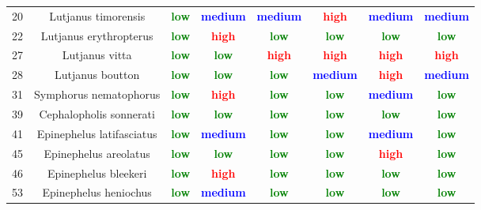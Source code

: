\documentclass{report}\usepackage[]{graphicx}\usepackage[]{color}
\begin{document}
\begin{table}[ht]
{\begin{tabular}{cccccccc}
   20 & Lutjanus timorensis & \textcolor{green}{\textbf{low}} & \textcolor{blue}{\textbf{medium}} & \textcolor{blue}{\textbf{medium}} & \textcolor{red}{\textbf{high}} & \textcolor{blue}{\textbf{medium}} & \textcolor{blue}{\textbf{medium}} \\ 
   22 & Lutjanus erythropterus & \textcolor{green}{\textbf{low}} & \textcolor{red}{\textbf{high}} & \textcolor{green}{\textbf{low}} & \textcolor{green}{\textbf{low}} & \textcolor{green}{\textbf{low}} & \textcolor{green}{\textbf{low}} \\ 
   27 & Lutjanus vitta & \textcolor{green}{\textbf{low}} & \textcolor{green}{\textbf{low}} & \textcolor{red}{\textbf{high}} & \textcolor{red}{\textbf{high}} & \textcolor{red}{\textbf{high}} & \textcolor{red}{\textbf{high}} \\ 
   28 & Lutjanus boutton & \textcolor{green}{\textbf{low}} & \textcolor{green}{\textbf{low}} & \textcolor{green}{\textbf{low}} & \textcolor{blue}{\textbf{medium}} & \textcolor{red}{\textbf{high}} & \textcolor{blue}{\textbf{medium}} \\ 
   31 & Symphorus nematophorus & \textcolor{green}{\textbf{low}} & \textcolor{red}{\textbf{high}} & \textcolor{green}{\textbf{low}} & \textcolor{green}{\textbf{low}} & \textcolor{blue}{\textbf{medium}} & \textcolor{green}{\textbf{low}} \\ 
   39 & Cephalopholis sonnerati & \textcolor{green}{\textbf{low}} & \textcolor{green}{\textbf{low}} & \textcolor{green}{\textbf{low}} & \textcolor{green}{\textbf{low}} & \textcolor{green}{\textbf{low}} & \textcolor{green}{\textbf{low}} \\ 
   41 & Epinephelus latifasciatus & \textcolor{green}{\textbf{low}} & \textcolor{blue}{\textbf{medium}} & \textcolor{green}{\textbf{low}} & \textcolor{green}{\textbf{low}} & \textcolor{blue}{\textbf{medium}} & \textcolor{green}{\textbf{low}} \\ 
   45 & Epinephelus areolatus & \textcolor{green}{\textbf{low}} & \textcolor{green}{\textbf{low}} & \textcolor{green}{\textbf{low}} & \textcolor{green}{\textbf{low}} & \textcolor{red}{\textbf{high}} & \textcolor{green}{\textbf{low}} \\ 
   46 & Epinephelus bleekeri & \textcolor{green}{\textbf{low}} & \textcolor{red}{\textbf{high}} & \textcolor{green}{\textbf{low}} & \textcolor{green}{\textbf{low}} & \textcolor{green}{\textbf{low}} & \textcolor{green}{\textbf{low}} \\ 
   53 & Epinephelus heniochus & \textcolor{green}{\textbf{low}} & \textcolor{blue}{\textbf{medium}} & \textcolor{green}{\textbf{low}} & \textcolor{green}{\textbf{low}} & \textcolor{green}{\textbf{low}} & \textcolor{green}{\textbf{low}} \\ 

\end{tabular}}
\end{table}
\end{document}
